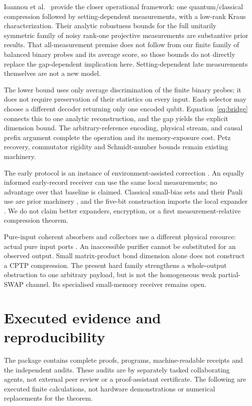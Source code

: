 \documentclass[11pt]{article}
\begin{document}
Ioannou et al.~\cite{simulability} provide the closer operational framework:
one quantum/classical compression followed by setting-dependent measurements,
with a low-rank Kraus characterization. Their analytic robustness bounds for
the full unitarily symmetric family of noisy rank-one projective measurements
are substantive prior results. That all-measurement premise does not follow
from our finite family of balanced binary probes and its average score, so
those bounds do not directly replace the gap-dependent implication here.
Setting-dependent late measurements themselves are not a new model.

The lower bound uses only average discrimination of the finite binary probes;
it does not require preservation of their statistics on every input. Each
selector may choose a different decoder returning only one encoded qubit.
Equation~\eqref{eq:bridge} connects this to one analytic reconstruction, and
the gap yields the explicit dimension bound. The
arbitrary-reference encoding, physical stream, and causal prefix argument
complete the operation and its memory-exposure cost. Petz recovery,
commutator rigidity and Schmidt-number bounds remain existing machinery.

The early protocol is an instance of environment-assisted correction
\cite{gw}. An equally informed early-record receiver can use the same local
measurements; no advantage over that baseline is claimed. Classical small-bias
sets and their Pauli use are prior machinery \cite{aghp,as}, and the five-bit
construction imports the local expander \cite{depthone}. We do not claim better
expanders, encryption, or a first measurement-relative compression theorem.

Pure-input coherent absorbers and collectors use a different physical resource:
actual pure input ports \cite{absorber}. An inaccessible purifier cannot be
substituted for an observed output. Small matrix-product bond dimension alone
does not construct a CPTP compression. The present hard family strengthens a
whole-output obstruction to one arbitrary payload, but is not the homogeneous
weak partial-SWAP channel. Its specialised small-memory receiver remains open.

\section{Executed evidence and reproducibility}\label{sec:evidence}
The package contains complete proofs, programs, machine-readable receipts and
the independent audits. These audits are by separately tasked collaborating
agents, not external peer review or a proof-assistant certificate.
The following are executed finite calculations, not
hardware demonstrations or numerical replacements for the theorem.
\end{document}
